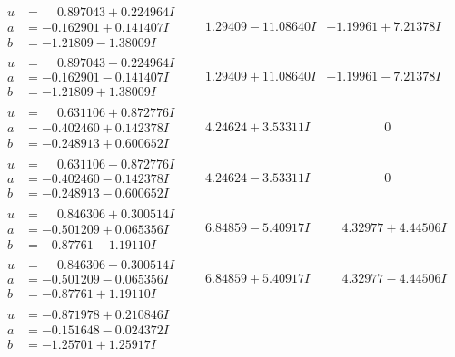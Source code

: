 \documentclass[1p]{elsarticle_modified}
\theoremstyle{definition}
\begin{document}
$$\begin{array}{c|c|c}
\begin{aligned}
u &= \phantom{-}0.897043 + 0.224964 I \\
a &= -0.162901 + 0.141407 I \\
b &= -1.21809 - 1.38009 I\end{aligned}
 & \phantom{-}1.29409 - 11.08640 I & -1.19961 + 7.21378 I \\ \hline\begin{aligned}
u &= \phantom{-}0.897043 - 0.224964 I \\
a &= -0.162901 - 0.141407 I \\
b &= -1.21809 + 1.38009 I\end{aligned}
 & \phantom{-}1.29409 + 11.08640 I & -1.19961 - 7.21378 I \\ \hline\begin{aligned}
u &= \phantom{-}0.631106 + 0.872776 I \\
a &= -0.402460 + 0.142378 I \\
b &= -0.248913 + 0.600652 I\end{aligned}
 & \phantom{-}4.24624 + 3.53311 I & \phantom{-0.000000 } 0 \\ \hline\begin{aligned}
u &= \phantom{-}0.631106 - 0.872776 I \\
a &= -0.402460 - 0.142378 I \\
b &= -0.248913 - 0.600652 I\end{aligned}
 & \phantom{-}4.24624 - 3.53311 I & \phantom{-0.000000 } 0 \\ \hline\begin{aligned}
u &= \phantom{-}0.846306 + 0.300514 I \\
a &= -0.501209 + 0.065356 I \\
b &= -0.87761 - 1.19110 I\end{aligned}
 & \phantom{-}6.84859 - 5.40917 I & \phantom{-}4.32977 + 4.44506 I \\ \hline\begin{aligned}
u &= \phantom{-}0.846306 - 0.300514 I \\
a &= -0.501209 - 0.065356 I \\
b &= -0.87761 + 1.19110 I\end{aligned}
 & \phantom{-}6.84859 + 5.40917 I & \phantom{-}4.32977 - 4.44506 I \\ \hline\begin{aligned}
u &= -0.871978 + 0.210846 I \\
a &= -0.151648 - 0.024372 I \\
b &= -1.25701 + 1.25917 I\end{aligned}

\end{array}$$
\end{document}
